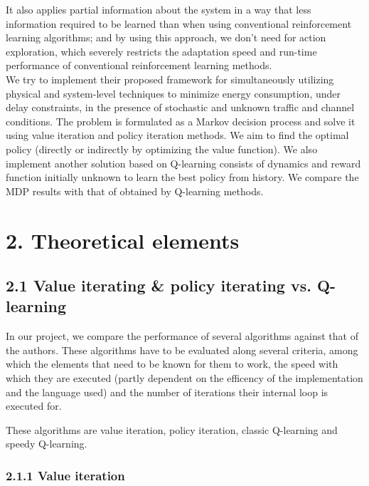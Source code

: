 \documentclass[a4paper, 12pt]{report}
\begin{document}
It also applies partial information about the system in a way that less information required to be learned than when using conventional reinforcement learning algorithms; and by using this approach, we don't need for action exploration, which severely restricts the adaptation speed and run-time performance of conventional reinforcement learning methods.
\\ 
We try to implement their proposed framework for simultaneously utilizing physical and system-level techniques to minimize energy consumption, under delay constraints, in the presence of stochastic and unknown traffic and channel conditions. 
The problem is formulated as a Markov decision process and solve it using value iteration and policy iteration methods. We aim to find the optimal policy (directly or indirectly by optimizing the
value function). We also implement another solution based on Q-learning consists of dynamics and reward function initially unknown to learn the best policy from history.
We compare the MDP results with that of obtained by Q-learning methods.

\chapter*{2. Theoretical elements}

\section*{2.1 Value iterating \& policy iterating vs. Q-learning}

In our project, we compare the performance of several algorithms against that of the authors.
These algorithms have to be evaluated along several criteria, among which the elements that need to be known
for them to work, the speed with which they are executed (partly dependent on the efficency of the implementation and the language used)
and the number of iterations their internal loop is executed for.

These algorithms are value iteration, policy iteration, classic Q-learning and speedy Q-learning.

\subsection*{2.1.1 Value iteration}
\end{document}
